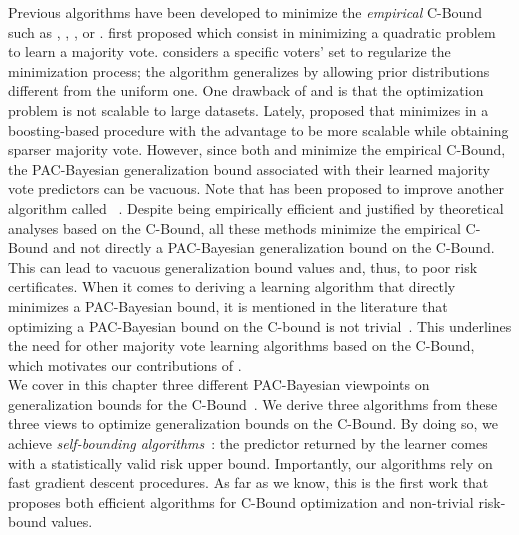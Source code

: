 Previous algorithms have been developed to minimize the {\it empirical} C-Bound such as \mincq \citep{RoyLavioletteMarchand2011}, \pmincq \citep{BelletHabrardMorvantSebban2014}, \cqboost \citep{RoyMarchandLaviolette2016}, or \cbboost \citep{BauvinCapponiRoyLaviolette2020}.
\citet{RoyLavioletteMarchand2011} first proposed \mincq which consist in minimizing a quadratic problem to learn a majority vote.
\mincq considers a specific voters' set to regularize the minimization process; the algorithm \pmincq generalizes \mincq by allowing prior distributions different from the uniform one.
One  drawback of \mincq and \pmincq is that the optimization problem is not scalable to large datasets.
Lately, \citet{BauvinCapponiRoyLaviolette2020} proposed \cbboost that minimizes in a boosting-based procedure with the advantage to be more scalable while obtaining sparser majority vote.
However, since both \mincq and \cbboost minimize the empirical C-Bound, the PAC-Bayesian generalization bound associated with their learned majority vote predictors can be vacuous.
Note that \cbboost has been proposed to improve another algorithm called  \cqboost~\citep{RoyMarchandLaviolette2016}.
Despite being empirically efficient and justified by theoretical analyses based on the C-Bound, all these methods minimize the empirical C-Bound and not directly a PAC-Bayesian generalization bound on the C-Bound.
This can lead to vacuous generalization bound values and, thus, to poor risk certificates.
When it comes to deriving a learning algorithm that directly minimizes a PAC-Bayesian bound, it is mentioned in the literature that optimizing a PAC-Bayesian bound on the C-bound is not trivial~\citep{MasegosaLorenzenIgelSeldin2020,LorenzenIgelSeldin2019}. 
This underlines the need for other majority vote learning algorithms based on the C-Bound, which motivates our contributions of .\\


We cover in this chapter three different PAC-Bayesian viewpoints on generalization bounds for the C-Bound~\citep{McAllester2003,Seeger2002,LacasseLavioletteMarchandGermainUsunier2006}.
We derive three algorithms from these three views to optimize generalization bounds on the C-Bound.
By doing so, we achieve {\it self-bounding algorithms}~\citep{Freund1998}: the predictor returned by the learner comes with a statistically valid risk upper bound. 
Importantly, our algorithms rely on fast gradient descent procedures. 
As far as we know, this is the first work that proposes both efficient algorithms for C-Bound optimization and non-trivial risk-bound values.\\

